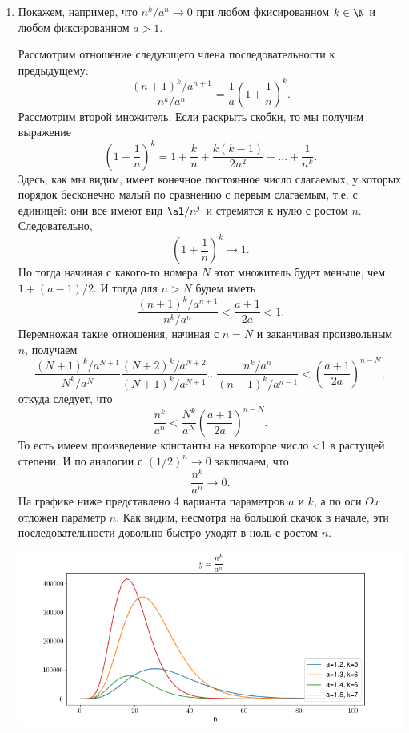 \begin{enumerate}


\item Покажем, например, что $n^k/a^n\to 0$ при любом фкисированном $k\in\N$ и любом фиксированном $a>1$.

Рассмотрим отношение следующего члена последовательности к предыдущему:
$$
\frac{(n+1)^k/a^{n+1}}{n^k/a^n} = \frac 1a\left(1+\frac 1n\right)^k.
$$
Рассмотрим второй множитель. Если раскрыть скобки, то мы получим выражение
$$
\left(1+\frac 1n\right)^k = 1 + \frac kn + \frac{k(k-1)}{2n^2} + \dots + \frac{1}{n^k}.
$$
Здесь, как мы видим, имеет конечное постоянное число слагаемых, у которых порядок бесконечно малый по сравнению с первым слагаемым, т.е. с единицей: они все имеют вид $\al/n^j$ и стремятся к нулю с ростом $n$. Следовательно,
$$
\left(1+\frac 1n\right)^k \to 1.
$$
Но тогда начиная с какого-то номера $N$ этот множитель будет меньше, чем $1+(a-1)/2$. И тогда для $n>N$ будем иметь
$$
\frac{(n+1)^k/a^{n+1}}{n^k/a^n} < \frac{a+1}{2a} < 1.
$$
Перемножая такие отношения, начиная с $n=N$ и заканчивая произвольным $n$, получаем
$$
\frac{(N+1)^k/a^{N+1}}{N^k/a^N}\frac{(N+2)^k/a^{N+2}}{(N+1)^k/a^{N+1}}\dots
\frac{n^k/a^n}{(n-1)^k/a^{n-1}}<\left(\frac{a+1}{2a}\right)^{n-N},
$$
откуда следует, что
$$
\frac{n^k}{a^n} < \frac{N^k}{a^N}\left(\frac{a+1}{2a}\right)^{n-N}.
$$
То есть имеем произведение константы на некоторое число <1 в растущей степени. И по аналогии с $(1/2)^n\to 0$ заключаем, что
$$
\frac{n^k}{a^n}\to 0.
$$
На графике ниже представлено 4 варианта параметров $a$ и $k$, а по оси $Ox$ отложен параметр $n$. Как видим, несмотря на большой скачок в начале, эти последовательности довольно быстро уходят в ноль с ростом $n$.
\begin{center}
\includegraphics[scale=0.5]{power.png}
\end{center}






\end{enumerate}
